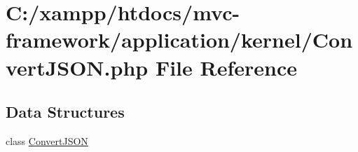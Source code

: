 \hypertarget{_convert_j_s_o_n_8php}{}\section{C\+:/xampp/htdocs/mvc-\/framework/application/kernel/\+Convert\+J\+S\+O\+N.php File Reference}
\label{_convert_j_s_o_n_8php}
\subsection*{Data Structures}
\begin{DoxyCompactItemize}
\item 
class \hyperlink{class_convert_j_s_o_n}{Convert\+J\+S\+O\+N}
\end{DoxyCompactItemize}
